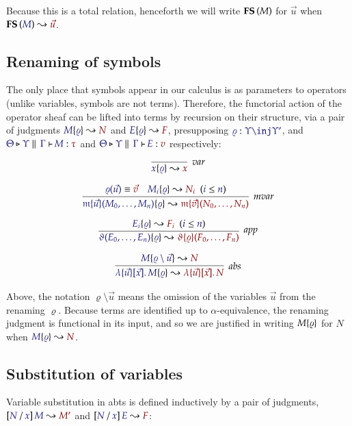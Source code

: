 \documentclass[11pt]{article}
\theoremstyle{definition}
\theoremstyle{remark}
\numberwithin{equation}{section}
\newcommand\CalcFS[2]{
  \FS{\IMode{#1}}\leadsto \OMode{#2}
}
\begin{document}
Because this is a total relation, henceforth we will write $\mathbf{FS}\left(M\right)$ for
$\vec{u}$ when $\CalcFS{M}{\vec{u}}$.


\subsection{Renaming of symbols}

The only place that symbols appear in our calculus is as parameters to operators
(unlike variables, symbols are not terms). Therefore, the functorial action of
the operator sheaf can be lifted into terms by recursion on their
structure, via a pair of judgments $\IsRenaming{\varrho}{M}{N}$ and
$\IsRenaming{\varrho}{E}{F}$, presupposing $\Of{\varrho}{\Upsilon\inj\Upsilon'}$,
and $\IsAbt{\Theta}{\Upsilon}{\Gamma}{M}{\tau}$ and
$\IsAbt{\Theta}{\Upsilon}{\Gamma}{E}{v}$ respectively:

\begin{gather*}
  \infer[\textit{var}]{
    \IsRenaming{\varrho}{x}{x}
  }{
  }
\\[6pt]
  \infer[\textit{mvar}]{
    \IsRenaming{\varrho}{
      \MApp{\MV{m}}{\vec{u}}{M_0,\dots,M_n}
    }{
      \MApp{\MV{m}}{\vec{v}}{N_0,\dots,N_n}
    }
  }{
    \Match{\varrho(\vec{u})}{\vec{v}}
&
    \HypJ{
      \IsRenaming{\varrho}{M_i}{N_i}
    }{
      \Leq{i}{n}
    }
  }
\\[6pt]
  \infer[\textit{app}]{
    \IsRenaming{\varrho}{
      \App{\vartheta}{E_0,\dots,E_n}
    }{
      \App{\Rename{\varrho}{\vartheta}}{F_0,\dots,F_n}
    }
  }{
    \HypJ{
      \IsRenaming{\varrho}{E_i}{F_i}
    }{
      \Leq{i}{n}
    }
  }
\\[6pt]
  \infer[\textit{abs}]{
    \IsRenaming{\varrho}{
      \MkBTm{\vec{u}}{\vec{x}}{M}
    }{
      \MkBTm{\vec{u}}{\vec{x}}{N}
    }
  }{
    \IsRenaming{\varrho\setminus\vec{u}}{M}{N}
  }
\end{gather*}

Above, the notation $\varrho\setminus\vec{u}$ means the omission of the
variables $\vec{u}$ from the renaming $\varrho$. Because terms are identified up
to $\alpha$-equivalence, the renaming judgment is functional in its input, and
so we are justified in writing $M\{\varrho\}$ for $N$ when
$\IsRenaming{\varrho}{M}{N}$.

\subsection{Substitution of variables}

Variable substitution in abts is defined inductively by a pair of judgments,
$\IsSubst{N}{x}{M}{M'}$ and $\IsSubst{N}{x}{E}{F}$:
\end{document}
